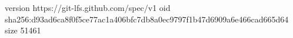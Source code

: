 version https://git-lfs.github.com/spec/v1
oid sha256:d93ad6ca8f0f5ce77ac1a406bfc7db8a0ec9797f1b47d6909a6e466cad665d64
size 51461
